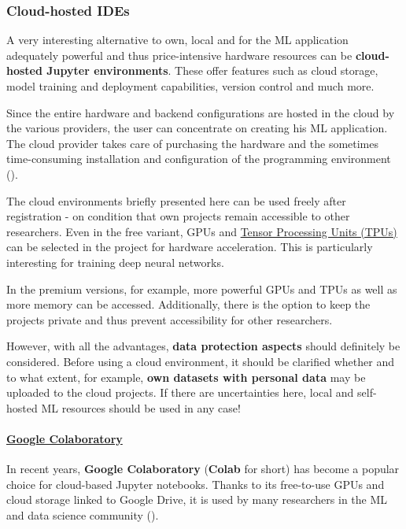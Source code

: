 \documentclass [oneside,10pt,a4paper,ngerman,BCOR10mm,headsepline,parindent,final]{scrartcl}
\begin{document}
    \hypertarget{cloud-hosted-ides}{%
\subsubsection{Cloud-hosted IDEs}\label{cloud-hosted-ides}}

A very interesting alternative to own, local and for the ML application
adequately powerful and thus price-intensive hardware resources can be
\textbf{cloud-hosted Jupyter environments}. These offer features such as
cloud storage, model training and deployment capabilities, version
control and much more.

Since the entire hardware and backend configurations are hosted in the
cloud by the various providers, the user can concentrate on creating his
ML application. The cloud provider takes care of purchasing the hardware
and the sometimes time-consuming installation and configuration of the
programming environment (\cite{Colab_Alternatives_2021}).

The cloud environments briefly presented here can be used freely after
registration - on condition that own projects remain accessible to other
researchers. Even in the free variant, GPUs and
\href{https://en.wikipedia.org/wiki/Tensor_Processing_Unit}{Tensor
Processing Units (TPUs)} can be selected in the project for hardware
acceleration. This is particularly interesting for training deep neural
networks.

In the premium versions, for example, more powerful GPUs and TPUs as
well as more memory can be accessed. Additionally, there is the option
to keep the projects private and thus prevent accessibility for other
researchers.

However, with all the advantages, \textbf{data protection aspects}
should definitely be considered. Before using a cloud environment, it
should be clarified whether and to what extent, for example, \textbf{own
datasets with personal data} may be uploaded to the cloud projects. If
there are uncertainties here, local and self-hosted ML resources should
be used in any case!

    \hypertarget{google-colaboratory}{%
\paragraph{\texorpdfstring{\href{https://colab.research.google.com/}{Google
Colaboratory}}{Google Colaboratory}}\label{google-colaboratory}}

In recent years, \textbf{Google Colaboratory} (\textbf{Colab} for short)
has become a popular choice for cloud-based Jupyter notebooks. Thanks to
its free-to-use GPUs and cloud storage linked to Google Drive, it is
used by many researchers in the ML and data science community
(\cite{Colab_Alternatives_2021}).
\end{document}
